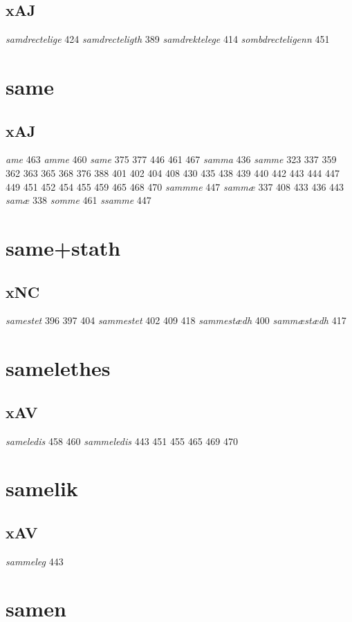 \documentclass[a4paper,twocolumn]{article}
\begin{document}
\subsection{xAJ}
\label{sec:org904697d}
\emph{samdrectelige} 424 \emph{samdrecteligth} 389 \emph{samdrektelege} 414 \emph{sombdrecteligenn} 451 
\section{same}
\label{sec:org7264644}
\subsection{xAJ}
\label{sec:org47f22eb}
\emph{ame} 463 \emph{amme} 460 \emph{same} 375 377 446 461 467 \emph{samma} 436 \emph{samme} 323 337 359 362 363 365 368 376 388 401 402 404 408 430 435 438 439 440 442 443 444 447 449 451 452 454 455 459 465 468 470 \emph{sammme} 447 \emph{sammæ} 337 408 433 436 443 \emph{samæ} 338 \emph{somme} 461 \emph{ssamme} 447 
\section{same+stath}
\label{sec:org0e98744}
\subsection{xNC}
\label{sec:org2066382}
\emph{samestet} 396 397 404 \emph{sammestet} 402 409 418 \emph{sammestædh} 400 \emph{sammæstædh} 417 
\section{samelethes}
\label{sec:org249556d}
\subsection{xAV}
\label{sec:orgf728a22}
\emph{sameledis} 458 460 \emph{sammeledis} 443 451 455 465 469 470 
\section{samelik}
\label{sec:org6cf950d}
\subsection{xAV}
\label{sec:org46d4dec}
\emph{sammeleg} 443 
\section{samen}
\label{sec:org1c75903}
\end{document}

